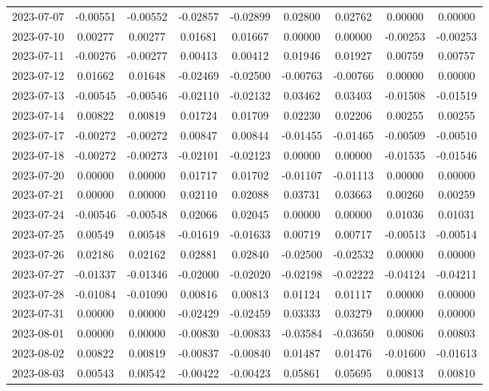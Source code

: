 {\begin{footnotesize}
\begin{longtable}{lcccccccc}
2023-07-07 & -0.00551 & -0.00552 & -0.02857 & -0.02899 & 0.02800 & 0.02762 & 0.00000 & 0.00000 \\
2023-07-10 & 0.00277 & 0.00277 & 0.01681 & 0.01667 & 0.00000 & 0.00000 & -0.00253 & -0.00253 \\
2023-07-11 & -0.00276 & -0.00277 & 0.00413 & 0.00412 & 0.01946 & 0.01927 & 0.00759 & 0.00757 \\
2023-07-12 & 0.01662 & 0.01648 & -0.02469 & -0.02500 & -0.00763 & -0.00766 & 0.00000 & 0.00000 \\
2023-07-13 & -0.00545 & -0.00546 & -0.02110 & -0.02132 & 0.03462 & 0.03403 & -0.01508 & -0.01519 \\
2023-07-14 & 0.00822 & 0.00819 & 0.01724 & 0.01709 & 0.02230 & 0.02206 & 0.00255 & 0.00255 \\
2023-07-17 & -0.00272 & -0.00272 & 0.00847 & 0.00844 & -0.01455 & -0.01465 & -0.00509 & -0.00510 \\
2023-07-18 & -0.00272 & -0.00273 & -0.02101 & -0.02123 & 0.00000 & 0.00000 & -0.01535 & -0.01546 \\
2023-07-20 & 0.00000 & 0.00000 & 0.01717 & 0.01702 & -0.01107 & -0.01113 & 0.00000 & 0.00000 \\
2023-07-21 & 0.00000 & 0.00000 & 0.02110 & 0.02088 & 0.03731 & 0.03663 & 0.00260 & 0.00259 \\
2023-07-24 & -0.00546 & -0.00548 & 0.02066 & 0.02045 & 0.00000 & 0.00000 & 0.01036 & 0.01031 \\
2023-07-25 & 0.00549 & 0.00548 & -0.01619 & -0.01633 & 0.00719 & 0.00717 & -0.00513 & -0.00514 \\
2023-07-26 & 0.02186 & 0.02162 & 0.02881 & 0.02840 & -0.02500 & -0.02532 & 0.00000 & 0.00000 \\
2023-07-27 & -0.01337 & -0.01346 & -0.02000 & -0.02020 & -0.02198 & -0.02222 & -0.04124 & -0.04211 \\
2023-07-28 & -0.01084 & -0.01090 & 0.00816 & 0.00813 & 0.01124 & 0.01117 & 0.00000 & 0.00000 \\
2023-07-31 & 0.00000 & 0.00000 & -0.02429 & -0.02459 & 0.03333 & 0.03279 & 0.00000 & 0.00000 \\
2023-08-01 & 0.00000 & 0.00000 & -0.00830 & -0.00833 & -0.03584 & -0.03650 & 0.00806 & 0.00803 \\
2023-08-02 & 0.00822 & 0.00819 & -0.00837 & -0.00840 & 0.01487 & 0.01476 & -0.01600 & -0.01613 \\
2023-08-03 & 0.00543 & 0.00542 & -0.00422 & -0.00423 & 0.05861 & 0.05695 & 0.00813 & 0.00810 \\

\end{longtable}
\end{footnotesize}}
